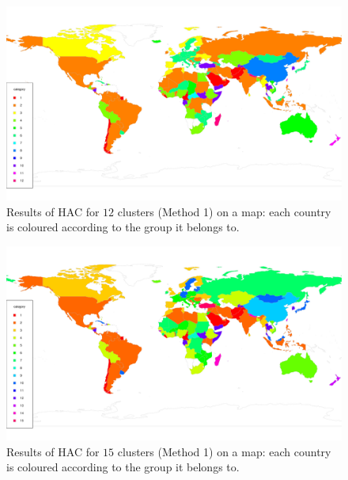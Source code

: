 \documentclass[a4paper,12pt]{article}
\numberwithin{equation}{section}
\begin{document}
\begin{figure}[t!]
\begin{minipage}[t]{0.98\textwidth}
\includegraphics[width=\textwidth]{plots/14days/map_12cl}
\caption{Results of HAC for $12$ clusters (Method 1) on a map: each country is coloured according to the group it belongs to.}
\end{minipage}
\end{figure}

\newpage 
\FloatBarrier
\begin{figure}[t!]
\begin{minipage}[t]{0.98\textwidth}
\includegraphics[width=\textwidth]{plots/14days/map_15cl}
\caption{Results of HAC for $15$ clusters (Method 1) on a map: each country is coloured according to the group it belongs to.}\label{fig:map_15cl}
\end{minipage}
\end{figure}
\end{document}
